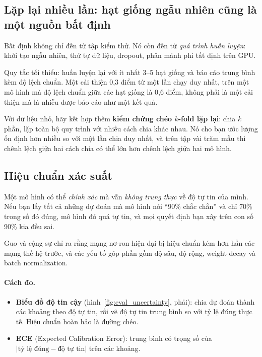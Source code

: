 \subsection{Lặp lại nhiều lần: hạt giống ngẫu nhiên cũng là một nguồn bất định}
\label{ssec:seed_variance}

Bất định không chỉ đến từ tập kiểm thử. Nó còn đến từ \emph{quá trình huấn luyện}: khởi tạo ngẫu nhiên, thứ tự dữ liệu, dropout, phân mảnh phi tất định trên GPU.

Quy tắc tối thiểu: huấn luyện lại với ít nhất 3--5 hạt giống và báo cáo trung bình kèm độ lệch chuẩn. Một cải thiện 0{,}3 điểm từ một lần chạy duy nhất, trên một mô hình mà độ lệch chuẩn giữa các hạt giống là 0{,}6 điểm, không phải là một cải thiện mà là nhiễu được báo cáo như một kết quả.

Với dữ liệu nhỏ, hãy kết hợp thêm \textbf{kiểm chứng chéo $k$-fold lặp lại}: chia $k$ phần, lặp toàn bộ quy trình với nhiều cách chia khác nhau. Nó cho bạn ước lượng ổn định hơn nhiều so với một lần chia duy nhất, và trên tập vài trăm mẫu thì chênh lệch giữa hai cách chia có thể lớn hơn chênh lệch giữa hai mô hình.

\subsection{Hiệu chuẩn xác suất}
\label{ssec:calibration}

Một mô hình có thể \emph{chính xác} mà vẫn \emph{không trung thực} về độ tự tin của mình. Nếu bạn lấy tất cả những dự đoán mà mô hình nói “90\% chắc chắn” và chỉ 70\% trong số đó đúng, mô hình đó quá tự tin, và mọi quyết định bạn xây trên con số 90\% kia đều sai.

Guo và cộng sự \cite{guo2017calibration} chỉ ra rằng mạng nơ-ron hiện đại bị hiệu chuẩn kém hơn hẳn các mạng thế hệ trước, và các yếu tố góp phần gồm độ sâu, độ rộng, weight decay và batch normalization.

\paragraph{Cách đo.}
\begin{itemize}
	\item \textbf{Biểu đồ độ tin cậy} (hình~\ref{fig:eval_uncertainty}, phải): chia dự đoán thành các khoảng theo độ tự tin, rồi vẽ độ tự tin trung bình so với tỷ lệ đúng thực tế. Hiệu chuẩn hoàn hảo là đường chéo.
	\item \textbf{ECE} (Expected Calibration Error): trung bình có trọng số của $|\text{tỷ lệ đúng} - \text{độ tự tin}|$ trên các khoảng.
\end{itemize}

